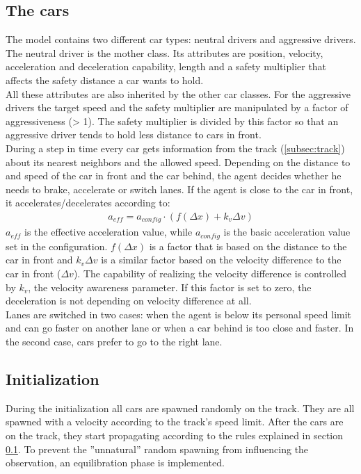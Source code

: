 \documentclass[11pt,a4paper,twocolumn]{article}
\begin{document}
\subsection{The cars} \label{subsec:cars}
The model contains two different car types: neutral drivers and aggressive drivers. The neutral driver is the mother class. Its attributes are position, velocity, acceleration and deceleration capability, length and a safety multiplier that affects the safety distance a car wants to hold. \\
All these attributes are also inherited by the other car classes. 
For the aggressive drivers the target speed and the safety multiplier are manipulated by a factor of aggressiveness (> 1). The safety multiplier is divided by this factor so that an aggressive driver tends to hold less distance to cars in front. \\
During a step in time every car gets information from the track (\ref{subsec:track}) about its nearest neighbors and the allowed speed. Depending on the distance to and speed of the car in front and the car behind, the agent decides whether he needs to brake, accelerate or switch lanes. If the agent is close to the car in front, it accelerates/decelerates according to:
\begin{align}
a_{eff} = a_{config} \cdot (f(\Delta x) + k_v \Delta v) \label{eq:velo_param}
\end{align}
$a_{eff}$ is the effective acceleration value, while $a_{config}$ is the basic acceleration value set in the configuration. $f(\Delta x)$ is a factor that is based on the distance to the car in front and $k_v \Delta v$ is a similar factor based on the velocity difference to the car in front ($\Delta v$). The capability of realizing the velocity difference is controlled by $k_v$, the velocity awareness parameter. If this factor is set to zero, the deceleration is not depending on velocity difference at all.\\

Lanes are switched in two cases: when the agent is below its personal speed limit and can go faster on another lane or when a car behind is too close and faster. In the second case, cars prefer to go to the right lane.\\

\subsection{Initialization} \label{subsec:initialisation}
During the initialization all cars are spawned randomly on the track. They are all spawned with a velocity according to the track's speed limit. After the cars are on the track, they start propagating according to the rules explained in section \ref{subsec:cars}. To prevent the ''unnatural'' random spawning from influencing the observation, an equilibration phase is implemented.
\end{document}
